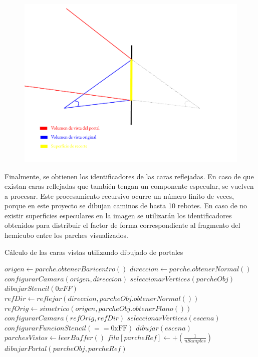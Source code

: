 \begin{figure}[htbp!]
	\centering
	\includegraphics[width=.9\linewidth]{assets/Espejo}
	\label{img:espejo}
\end{figure}

Finalmente, se obtienen los identificadores de las caras reflejadas. En caso de que existan caras reflejadas que también tengan un componente especular, se vuelven a procesar. Este procesamiento recursivo ocurre un número finito de veces, porque en este proyecto se dibujan caminos de hasta 10 rebotes. En caso de no existir superficies especulares en la imagen se utilizarán los identificadores obtenidos para distribuir el factor de forma correspondiente al fragmento del hemicubo entre los parches visualizados.

\begin{algorithm}
	\caption{Cálculo de las caras vistas utilizando dibujado de portales}
	\label{alg:9}
	\begin{algorithmic}
		\State $origen \gets parche.obtenerBaricentro()$
		\State $direccion \gets parche.obtenerNormal()$
		\State $configurarCamara(origen, direccion)$
		\State $seleccionarVertices(parcheObj)$
		\State $dibujarStencil(0xFF)$
		\State $refDir \gets reflejar(direccion, parcheObj.obtenerNormal())$
		\State $refOrig \gets simetrico(origen, parcheObj.obtenerPlano())$
		\State $configurarCamara(refOrig, refDir)$
		\State $seleccionarVertices(escena)$
		\State $configurarFuncionStencil(== \text{0xFF})$
		\State $dibujar(escena)$
		\State $parchesVistos \gets leerBuffer()$
		\State $fila[parcheRef] \gets +(\frac{1}{nSamples})$
		\State $dibujarPortal(parcheObj, parcheRef)$
		\EndIf
		\EndIf
		\EndLoop
		\EndFunction
	\end{algorithmic}
\end{algorithm}
